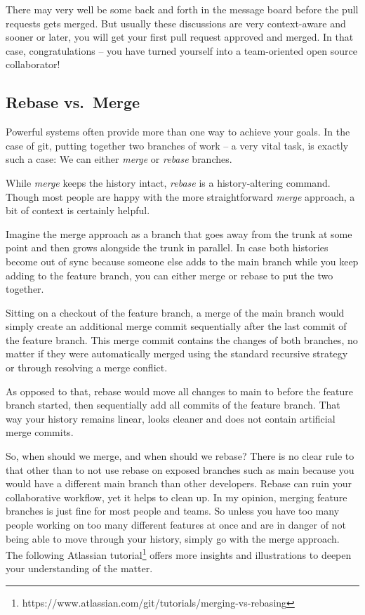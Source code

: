 \documentclass[
  12pt,
  letterpaper,
]{krantz}
\begin{document}
There may very well be some back and forth in the message board before
the pull requests gets merged. But usually these discussions are very
context-aware and sooner or later, you will get your first pull request
approved and merged. In that case, congratulations -- you have turned
yourself into a team-oriented open source collaborator!

\hypertarget{rebase-vs.-merge}{%
\subsection{\texorpdfstring{Rebase
vs.~Merge}{Rebase vs.~Merge}}\label{rebase-vs.-merge}}

Powerful systems often provide more than one way to achieve your goals.
In the case of git, putting together two branches of work -- a very
vital task, is exactly such a case: We can either \emph{merge} or
\emph{rebase} branches.

While \emph{merge} keeps the history intact, \emph{rebase} is a
history-altering command. Though most people are happy with the more
straightforward \emph{merge} approach, a bit of context is certainly
helpful.

Imagine the merge approach as a branch that goes away from the trunk at
some point and then grows alongside the trunk in parallel. In case both
histories become out of sync because someone else adds to the main
branch while you keep adding to the feature branch, you can either merge
or rebase to put the two together.

Sitting on a checkout of the feature branch, a
merge of the main branch would simply create an additional merge commit
sequentially after the last commit of the feature branch. This merge
commit contains the changes of both branches, no matter if they were
automatically merged using the standard recursive strategy or through
resolving a merge conflict.

As opposed to that, rebase would move all changes to main to before the
feature branch started, then sequentially add all commits of the feature
branch. That way your history remains linear, looks cleaner and does not
contain artificial merge commits.

So, when should we merge, and when should we rebase? There is no clear
rule to that other than to not use rebase on exposed branches such as
main because you would have a different main branch than other
developers. Rebase can ruin your collaborative workflow, yet it helps to
clean up. In my opinion, merging feature branches is just fine for most
people and teams. So unless you have too many people working on too many
different features at once and are in danger of not being able to move
through your history, simply go with the merge approach. The following
Atlassian tutorial\footnote{https://www.atlassian.com/git/tutorials/merging-vs-rebasing}
offers more insights and illustrations to deepen your understanding of
the matter.
\end{document}
